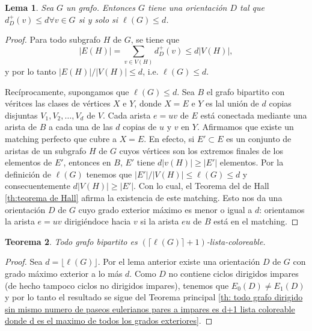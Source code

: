 \documentclass[12pt]{report}
\theoremstyle{plain}
\newtheorem{theorem}{Teorema}[section]
\newtheorem{lemma}[theorem]{Lema}
\theoremstyle{definition}
\newcommand{\abs}[1]{\left \vert #1 \right \vert}
\begin{document}
\begin{lemma}
Sea $G$ un grafo. Entonces $G$ tiene una orientación $D$ tal que $d^+_D (v) \leq d \forall v \in G$ si y solo si $\ell (G) \leq d$.
\end{lemma}
\begin{proof}
Para todo subgrafo $H$ de $G$, se tiene que
\[
    \abs{E(H)} = \sum_{v \in V(H)} d^+_D (v) \leq d \abs {V(H)},
\]
y por lo tanto $\abs{E(H)} / \abs{ V(H)} \leq d$, i.e. $\ell (G) \leq d$.

Recíprocamente, supongamos que $\ell(G) \leq d$. Sea $B$ el grafo bipartito con véritces las clases de vértices $X$ e $Y$, donde $X = E$ e $Y$ es lal unión de $d$ copias disjuntas $V_1, V_2, \ldots, V_d$ de $V$. Cada arista $e = uv$ de $E$ está conectada mediante una arista de $B$ a cada una de las $d$ copias de $u$ y $v$ en $Y$. Afirmamos que existe un matching perfecto que cubre a $X = E$. En efecto, si $E' \subset E$ es un conjunto de aristas de un subgrafo $H$ de $G$ cuyos vértices son los extremos finales de los elementos de $E'$, entonces en $B$, $E'$ tiene $d\abs{v(H)} \geq \abs {E'}$ elementos. Por la definición de $\ell (G)$ tenemos que $\abs{ E'} / \abs{V(H)} \leq \ell (G) \leq d$ y consecuentemente $d \abs{V(H)} \geq \abs{E'}$. Con lo cual, el Teorema del de Hall \ref{th:teorema de Hall} afirma la existencia de este matching. Esto nos da una orientación $D$ de $G$ cuyo grado exterior máximo es menor o igual a $d$: orientamos la arista $e = uv$ dirigiéndoce hacia $v$ si la arista $e u$ de $B$ está en el matching.
\end{proof}

\begin{theorem}
Todo grafo bipartito es $(\lceil \ell (G) \rceil + 1)$-lista-coloreable.
\end{theorem}
\begin{proof}
Sea $d = \lfloor \ell (G) \rfloor$. Por el lema anterior existe una orientación $D$ de $G$ con grado máximo exterior a lo más $d$. Como $D$ no contiene ciclos dirigidos impares (de hecho tampoco ciclos no dirigidos impares), tenemos que $E_0 (D) \neq E_1 (D)$ y por lo tanto el resultado se sigue del Teorema principal \ref{th: todo grafo dirigido sin mismo numero de paseos eulerianos pares a impares es d+1 lista coloreable donde d es el maximo de todos los grados exteriores}.
\end{proof}
\end{document}
